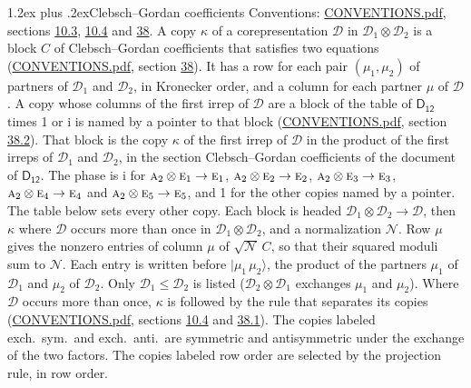\documentclass[10pt,a4paper]{article}
\makeatletter
\renewcommand\section{\@startsection{section}{1}{\z@}{-3ex plus -1ex minus -.2ex}%
  {1.2ex plus .2ex}{\normalfont\large\sffamily\bfseries\color{parttitle}}}
\numberwithin{equation}{section}
\newcommand{\grp}[1]{\mathsf{#1}}
\newcommand{\irr}[1]{\text{\normalfont\scshape #1}}
\newcommand{\iunit}{\mathrm{i}}
\newcommand{\irrprod}{\otimes}
\newcommand{\mult}{\kappa}
\newcommand{\intx}{\mu}
\newcommand{\cgnorm}{\mathcal{N}}
\newcommand{\prodket}[2]{\lvert {#1}\,{#2}\rangle}
\makeatother
\begin{document}
\section{Clebsch--Gordan coefficients}\label{s:clebsch_gordan}
Conventions: \href{../../CONVENTIONS.pdf}{CONVENTIONS.pdf}, sections \href{../../../rotation/CONVENTIONS.pdf\#conv.10.3}{10.3}, \href{../../../rotation/CONVENTIONS.pdf\#conv.10.4}{10.4} and \href{../../CONVENTIONS.pdf\#conv.38}{38}.
\leavevmode\label{n:index.copy}\label{n:matrix.cg.stored}A copy $\mult$ of a corepresentation $\mathcal{D}$ in $\mathcal{D}_1\irrprod\mathcal{D}_2$ is a block $C$ of Clebsch--Gordan coefficients that satisfies two equations (\href{../../CONVENTIONS.pdf}{CONVENTIONS.pdf}, section \href{../../CONVENTIONS.pdf\#conv.38}{38}). \label{n:index.cg}It has a row for each pair $(\intx_1, \intx_2)$ of partners of $\mathcal{D}_1$ and $\mathcal{D}_2$, in Kronecker order, and a column for each partner $\intx$ of $\mathcal{D}$.
A copy whose columns of the first irrep of $\mathcal{D}$ are a block of the table of $\grp{D_{12}}$ times 1 or $\iunit$ is named by a pointer to that block (\href{../../CONVENTIONS.pdf}{CONVENTIONS.pdf}, section \href{../../CONVENTIONS.pdf\#conv.38.2}{38.2}). That block is the copy $\mult$ of the first irrep of $\mathcal{D}$ in the product of the first irreps of $\mathcal{D}_1$ and $\mathcal{D}_2$, in the section Clebsch--Gordan coefficients of the document of \href{../../../rotation/data/pdf/D12.pdf}{$\grp{D_{12}}$}. The phase is $\iunit$ for $\irr{a}_{2}\irrprod \irr{e}_{1}\to \irr{e}_{1}$, $\irr{a}_{2}\irrprod \irr{e}_{2}\to \irr{e}_{2}$, $\irr{a}_{2}\irrprod \irr{e}_{3}\to \irr{e}_{3}$, $\irr{a}_{2}\irrprod \irr{e}_{4}\to \irr{e}_{4}$ and $\irr{a}_{2}\irrprod \irr{e}_{5}\to \irr{e}_{5}$, and 1 for the other copies named by a pointer. The table below sets every other copy.
Each block is headed $\mathcal{D}_1\irrprod\mathcal{D}_2\to\mathcal{D}$, then $\mult$ where $\mathcal{D}$ occurs more than once in $\mathcal{D}_1\irrprod\mathcal{D}_2$, and a normalization $\cgnorm$. Row $\intx$ gives the nonzero entries of column $\intx$ of $\sqrt{\cgnorm}\,C$, so that their squared moduli sum to $\cgnorm$. \label{n:vector.ket.product}Each entry is written before $\prodket{\intx_1}{\intx_2}$, the product of the partners $\intx_1$ of $\mathcal{D}_1$ and $\intx_2$ of $\mathcal{D}_2$. Only $\mathcal{D}_1 \le \mathcal{D}_2$ is listed ($\mathcal{D}_2\irrprod\mathcal{D}_1$ exchanges $\intx_1$ and $\intx_2$).
Where $\mathcal{D}$ occurs more than once, $\mult$ is followed by the rule that separates its copies (\href{../../CONVENTIONS.pdf}{CONVENTIONS.pdf}, sections \href{../../../rotation/CONVENTIONS.pdf\#conv.10.4}{10.4} and \href{../../CONVENTIONS.pdf\#conv.38.1}{38.1}). \label{n:abbreviation.exchange}The copies labeled exch.\ sym.\ and exch.\ anti.\ are symmetric and antisymmetric under the exchange of the two factors. The copies labeled row order are selected by the projection rule, in row order.
\end{document}
